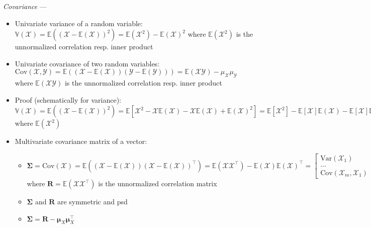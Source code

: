 \emph{Covariance} ---
\begin{itemize}
    \item Univariate variance of a random variable: $\mathbb{V}(\mathcal{X}) = \mathbb{E}((\mathcal{X}-\mathbb{E}(\mathcal{X}))^2) = \mathbb{E}(\mathcal{X}^2) - \mathbb{E}(\mathcal{X})^2$ where $\mathbb{E}(\mathcal{X}^2)$ is the unnormalized correlation resp. inner product
    \item Univariate covariance of two random variables: $\textrm{Cov}(\mathcal{X}, \mathcal{Y}) = \mathbb{E}((\mathcal{X}-\mathbb{E}(\mathcal{X}))(\mathcal{Y}-\mathbb{E}(\mathcal{Y}))) = \mathbb{E}(\mathcal{X}\mathcal{Y}) - \mu_{\mathcal{X}} \mu_{\mathcal{Y}}$ where $\mathbb{E}(\mathcal{X}\mathcal{Y})$ is the unnormalized correlation resp. inner product
    \item Proof (schematically for variance): $\mathbb{V}(\mathcal{X}) = \mathbb{E}((\mathcal{X}-\mathbb{E}(\mathcal{X}))^2) = \mathbb{E}[ \mathcal{X}^2 - \mathcal{X}\mathbb{E}(\mathcal{X}) - \mathcal{X}\mathbb{E}(\mathcal{X}) + \mathbb{E}(\mathcal{X})^2 ] = \mathbb{E}[ \mathcal{X}^2] - \mathbb{E}[\mathcal{X}]\mathbb{E}(\mathcal{X}) - \mathbb{E}[\mathcal{X}]\mathbb{E}(\mathcal{X}) + \mathbb{E}(\mathcal{X})^2 = \mathbb{E}(\mathcal{X}^2) - \mathbb{E}(\mathcal{X})^2$ where $\mathbb{E}(\mathcal{X}^2)$ 
    \item Multivariate covariance matrix of a vector: 
    \begin{itemize}
        \item $\boldsymbol{\Sigma} = \textrm{Cov}(\boldsymbol{\mathcal{X}}) = \mathbb{E}((\boldsymbol{\mathcal{X}}-\mathbb{E}(\boldsymbol{\mathcal{X}}))(\boldsymbol{\mathcal{X}}-\mathbb{E}(\boldsymbol{\mathcal{X}}))^\intercal) = \mathbb{E}(\boldsymbol{\mathcal{X}}\boldsymbol{\mathcal{X}}^\intercal) - \mathbb{E}(\boldsymbol{\mathcal{X}})\mathbb{E}(\boldsymbol{\mathcal{X}})^\intercal = \begin{bmatrix}
        \textrm{Var}(\mathcal{X}_1) & ... & \textrm{Cov}(\mathcal{X}_1,\mathcal{X}_m) \\
        ... & ... & ... \\
        \textrm{Cov}(\mathcal{X}_m,\mathcal{X}_1) & ... & \textrm{Var}(\mathcal{X}_m)
        \end{bmatrix}$ where $\boldsymbol{R} = \mathbb{E}(\boldsymbol{\mathcal{X}}\boldsymbol{\mathcal{X}}^\intercal)$ is the unnormalized correlation matrix
        \item $\boldsymbol{\Sigma}$ and $\boldsymbol{R}$ are symmetric and psd
        \item $\boldsymbol{\Sigma} = \boldsymbol{R} - \boldsymbol{\mu}_X \boldsymbol{\mu}_X^\intercal$
    \end{itemize}
\end{itemize}
